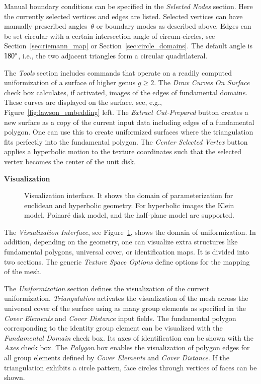 \documentclass[Thesis.tex]{subfiles}
\begin{document}
Manual boundary conditions can be specified in the \emph{Selected Nodes} section. 
Here the currently selected vertices and edges are listed. 
Selected vertices can have manually prescribed angles~$\theta$ or boundary modes as described above. 
Edges can be set circular with a certain intersection angle of circum-circles, see Section~\ref{sec:riemann_map} or Section~\ref{sec:circle_domains}. 
The default angle is $180\degree$, i.e., the two adjacent triangles form a circular quadrilateral.

The \emph{Tools} section includes commands that operate on a readily computed uniformization of a surface of higher genus $g\geq 2$. 
The \emph{Draw Curves On Surface} check box calculates, if activated, images of the edges of fundamental domains. 
These curves are displayed on the surface, see, e.g., Figure~\ref{fig:lawson_embedding} left. 
The \emph{Extract Cut-Prepared} button creates a new surface as a copy of the current input data including edges of a fundamental polygon. 
One can use this to create uniformized surfaces where the triangulation fits perfectly into the fundamental polygon. 
The \emph{Center Selected Vertex} button applies a hyperbolic motion to the texture coordinates such that the selected vertex becomes the center of the unit disk.

{\bf Visualization}

\begin{figure}
\caption{Visualization interface. It shows the domain of parameterization for euclidean and hyperbolic geometry. 
For hyperbolic images the Klein model, Poinar\'e disk model, and the half-plane model are supported.}
\label{fig:visualization_interfaces}
\end{figure}

The \emph{Visualization Interface}, see Figure~\ref{fig:visualization_interfaces}, shows the domain of uniformization. 
In addition, depending on the geometry, one can visualize extra structures like fundamental polygons, universal cover, or identification maps. 
It is divided into two sections. The generic \emph{Texture Space Options} define options for the mapping of the mesh. 

The \emph{Uniformization} section defines the visualization of the current uniformization. 
\emph{Triangulation} activates the visualization of the mesh across the universal cover of the surface using as many group elements as specified in the \emph{Cover Elements} and \emph{Cover Distance} input fields. 
The fundamental polygon corresponding to the identity group element can be visualized with the \emph{Fundamental Domain} check box. Its axes of identification can be shown with the \emph{Axes} check box. 
The \emph{Polygon} box enables the visualization of polygon edges for all group elements defined by \emph{Cover Elements} and \emph{Cover Distance}. 
If the triangulation exhibits a circle pattern, face circles through vertices of faces can be shown.
\end{document}
